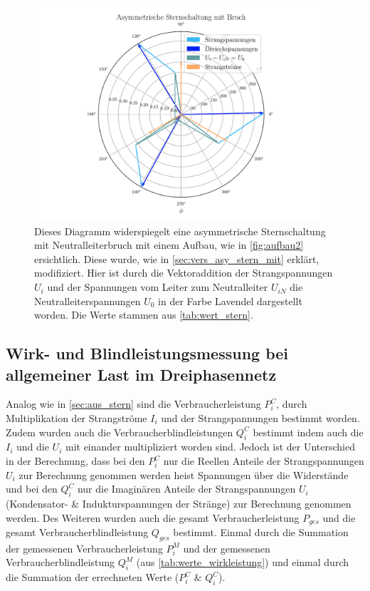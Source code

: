 \documentclass[12pt,english,ngerman]{scrartcl}
\begin{document}
\begin{figure}[H]
	\begin{center}
		\includegraphics[width = 0.95\textwidth]{figures/zeigerSternAsymBruch.pdf}
	\end{center}
	\caption[Zeigerdiagramm einer asymmetrisch ohmsch-belastete Sternschaltung mit
		Neutralleiterbruch]{Dieses Diagramm widerspiegelt eine asymmetrische
		Sternschaltung mit Neutralleiterbruch mit einem Aufbau, wie in
		\autoref{fig:aufbau2} ersichtlich. Diese wurde, wie in
		\autoref{sec:vers_asy_stern_mit} erklärt, modifiziert. Hier ist durch die
		Vektoraddition der Strangspannungen $U_i$ und der Spannungen vom Leiter zum
		Neutralleiter $U_{iN}$ die Neutralleiterspannungen $U_0$ in der Farbe Lavendel
		dargestellt worden. Die Werte stammen aus \autoref{tab:wert_stern}.
	}\label{fig:zeigerSternAsymBruch}
\end{figure}

\subsection{Wirk- und Blindleistungsmessung bei allgemeiner Last im Dreiphasennetz}

Analog wie in \autoref{sec:aus_stern} sind die Verbraucherleistung $P_i^C$,
durch Multiplikation der Strangströme $I_i$ und der Strangspannungen bestimmt
worden. Zudem wurden auch die Verbraucherblindleistungen $Q_i^C$ bestimmt indem
auch die $I_i$ und die $U_i$ mit einander multipliziert worden sind. Jedoch ist
der Unterschied in der Berechnung, dass bei den $P_i^C$ nur die Reellen Anteile
der Strangspannungen $U_i$ zur Berechnung genommen werden heist Spannungen über
die Widerstände und bei den $Q_i^C$ nur die Imaginären Anteile der
Strangspannungen $U_i$ (Kondensator- \& Indukturspannungen der Stränge) zur
Berechnung genommen werden. Des Weiteren wurden auch die gesamt
Verbraucherleistung $P_{ges}$ und die gesamt Verbraucherblindleistung $Q_{ges}$
bestimmt. Einmal durch die Summation der gemessenen Verbraucherleistung $P_i^M$
und der gemessenen Verbraucherblindleistung $Q_i^M$ (aus
\autoref{tab:werte_wirkleistung}) und einmal durch die Summation der
errechneten Werte ($P_i^C$ \& $Q_i^C$).
\end{document}
